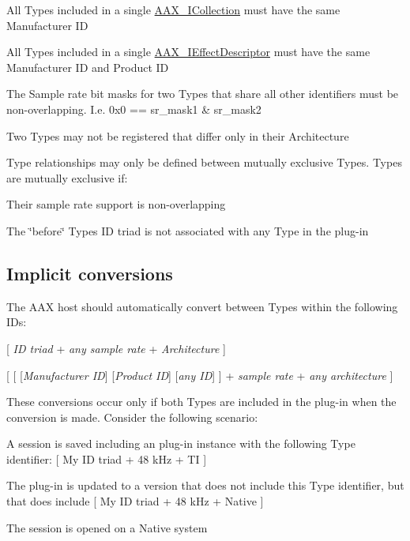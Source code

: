 \begin{DoxyItemize}
\item All Types included in a single \hyperlink{a00087}{A\+A\+X\+\_\+\+I\+Collection} must have the same Manufacturer I\+D  
\item All Types included in a single \hyperlink{a00096}{A\+A\+X\+\_\+\+I\+Effect\+Descriptor} must have the same Manufacturer I\+D and Product I\+D  
\item The Sample rate bit masks for two Types that share all other identifiers must be non-\/overlapping. I.\+e. {\ttfamily 0x0 == sr\+\_\+mask1 \& sr\+\_\+mask2}  
\item Two Types may not be registered that differ only in their Architecture  
\item Type relationships may only be defined between mutually exclusive Types. Types are mutually exclusive if\+: 
\begin{DoxyItemize}
\item Their sample rate support is non-\/overlapping  
\item The \char`\"{}before\char`\"{} Type\textquotesingle{}s I\+D triad is not associated with any Type in the plug-\/in  
\end{DoxyItemize}
\end{DoxyItemize}\hypertarget{a00356_advancedTopics_relatedTypes_implicitconversions}{}\subsection{Implicit conversions}\label{a00356_advancedTopics_relatedTypes_implicitconversions}
The A\+A\+X host should automatically convert between Types within the following I\+Ds\+: 
\begin{DoxyItemize}
\item \mbox{[} {\itshape I\+D triad} + {\itshape any sample rate} + {\itshape Architecture} \mbox{]}  
\item \mbox{[} \mbox{[} \mbox{[}{\itshape Manufacturer I\+D}\mbox{]} \mbox{[}{\itshape Product I\+D}\mbox{]} \mbox{[}{\itshape any I\+D}\mbox{]} \mbox{]} + {\itshape sample rate} + {\itshape any architecture} \mbox{]}  
\end{DoxyItemize}

These conversions occur only if both Types are included in the plug-\/in when the conversion is made. Consider the following scenario\+: 
\begin{DoxyEnumerate}
\item A session is saved including an plug-\/in instance with the following Type identifier\+: \mbox{[} My I\+D triad + 48 k\+Hz + T\+I \mbox{]}  
\item The plug-\/in is updated to a version that does not include this Type identifier, but that does include \mbox{[} My I\+D triad + 48 k\+Hz + Native \mbox{]}  
\item The session is opened on a Native system  
\end{DoxyEnumerate}

